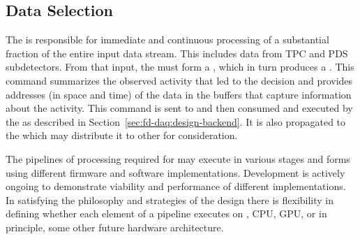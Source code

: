



\subsection{Data Selection}
\label{sec:sp-daq:design-selection-algs}

The  is responsible for immediate and continuous processing of a substantial fraction of the entire input data stream. 
This includes data from TPC and PDS subdetectors.
From that input, the  must form a ,
which in turn produces a .
This command summarizes the observed activity that led to the decision
and provides addresses (in space and time) of the data in the  buffers that capture information about the activity.
This command is sent to and then consumed and executed by the  as described in Section~\ref{sec:fd-daq:design-backend}. 
It is also propagated to the  which may distribute it to other  for consideration.

The pipelines of processing required for  may execute in
various stages and forms using different firmware and software
implementations. 
Development is actively ongoing to demonstrate
viability and performance of different implementations. In satisfying
the philosophy and strategies of the  design there is 
flexibility in defining whether each element of a pipeline executes on
, CPU, GPU, or in principle, some other future hardware
architecture. 

